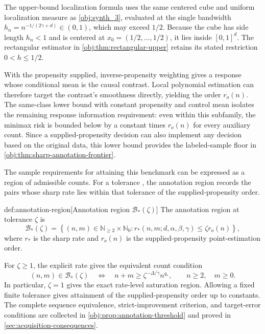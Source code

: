 \documentclass[11pt]{article}
\begin{document}
The upper-bound localization formula uses the same centered cube and uniform localization measure as \cref{obj:synth_3}, evaluated at the single bandwidth \(h_n=n^{-1/(2\gamma+d)}\in(0,1)\), which may exceed \(1/2\). Because the cube has side length \(h_n<1\) and is centered at \(x_0=(1/2,\ldots,1/2)\), it lies inside \([0,1]^d\). The rectangular estimator in \cref{obj:thm:rectangular-upper} retains its stated restriction \(0<h\le1/2\).

With the propensity supplied, inverse-propensity weighting gives a response whose conditional mean is the causal contrast. Local polynomial estimation can therefore target the contrast's smoothness directly, yielding the order \(r_o(n)\). The same-class lower bound with constant propensity and control mean isolates the remaining response information requirement: even within this subfamily, the minimax risk is bounded below by a constant times \(r_o(n)\) for every auxiliary count. Since a supplied-propensity decision can also implement any decision based on the original data, this lower bound provides the labeled-sample floor in \cref{obj:thm:sharp-annotation-frontier}.

The sample requirements for attaining this benchmark can be expressed as a region of admissible counts. For a tolerance , the annotation region  records the pairs whose sharp rate lies within that tolerance of the supplied-propensity order.

\begin{definitionv}{def:annotation-region}[Annotation region \(\mathcal B_*(\zeta)\)]
The annotation region at tolerance \(\zeta\) is
\[
\mathcal B_*(\zeta)=
\left\{
(n,m)\in\mathbb N_{\ge2}\times\mathbb N_0:
r_*(n,m;d,\alpha,\beta,\gamma)\le\zeta r_o(n)
\right\},
\]
where \(r_*\) is the sharp rate and \(r_o(n)\) is the supplied-propensity point-estimation order.
\end{definitionv}

For \(\zeta\ge1\), the explicit rate gives the equivalent count condition
\[
(n,m)\in\mathcal B_*(\zeta)
\quad\Longleftrightarrow\quad
n+m\ge \zeta^{-\Delta/\gamma}n^{q_*},
\qquad n\ge2,\quad m\ge0.
\]
In particular, \(\zeta=1\) gives the exact rate-level saturation region. Allowing a fixed finite tolerance gives attainment of the supplied-propensity order up to constants. The complete sequence equivalence, strict-improvement criterion, and target-error conditions are collected in \cref{obj:prop:annotation-threshold} and proved in \cref{sec:acquisition-consequences}.
\end{document}

